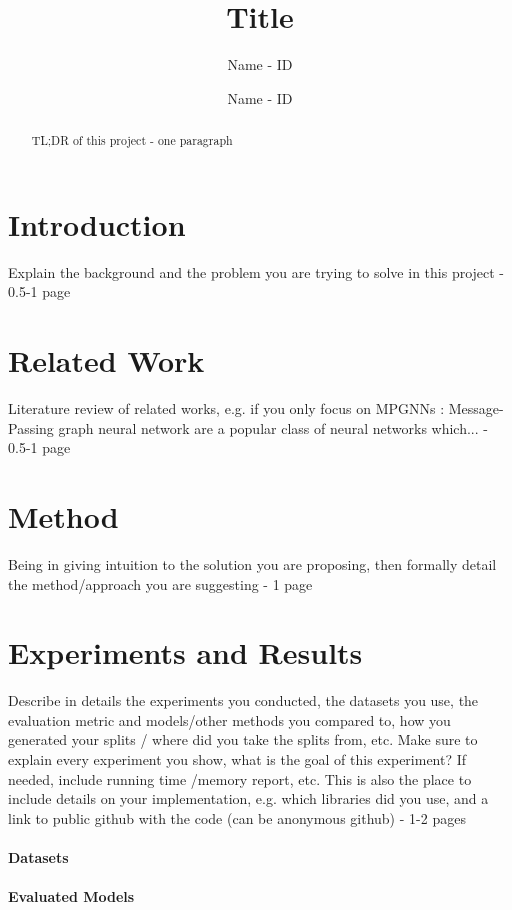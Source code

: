 \documentclass{acmart}
\title{Title}
\author{Name - ID}
\author{Name - ID}
\date{}
\begin{document}
\begin{abstract}
TL;DR of this project -  one paragraph
\end{abstract}
\maketitle

\section{Introduction}
 Explain the background and the problem you are trying to solve in this project - 0.5-1 page
\section{Related Work}
Literature review of related works, e.g. if you only focus on MPGNNs : Message-Passing graph neural network are a popular class of neural networks which...\cite{morris2021weisfeiler} - 0.5-1 page


\section{Method}
Being in giving intuition to the solution you are proposing, then formally detail the method/approach you are suggesting -  1 page



\section{Experiments and Results}
 Describe in details the experiments you conducted, the datasets you use, the evaluation metric and models/other methods you compared to, how you generated your splits / where did you take the splits from, etc. Make sure to explain every experiment you show, what is the goal of this experiment? If needed, include running time /memory report, etc.
This is also the place to include details on your implementation, e.g. which libraries did you use, and a link to public github with the code (can be anonymous github) - 1-2 pages

\paragraph{Datasets}

\paragraph{Evaluated Models}
\end{document}
